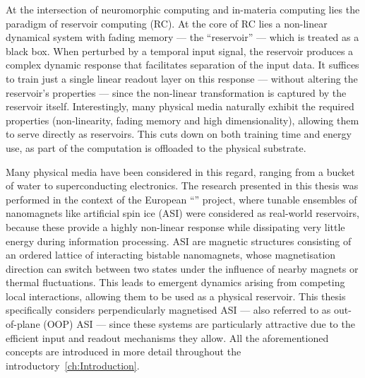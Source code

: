 At the intersection of neuromorphic computing and in-materia computing lies the paradigm of reservoir computing (RC).
At the core of RC lies a non-linear dynamical system with fading memory --- the ``reservoir'' --- which is treated as a black box.
When perturbed by a temporal input signal, the reservoir produces a complex dynamic response that facilitates separation of the input data.
It suffices to train just a single linear readout layer on this response --- without altering the reservoir's properties --- since the non-linear transformation is captured by the reservoir itself.
Interestingly, many physical media naturally exhibit the required properties (non-linearity, fading memory and high dimensionality), allowing them to serve directly as reservoirs.
This cuts down on both training time and energy use, as part of the computation is offloaded to the physical substrate. \par
Many physical media have been considered in this regard, ranging from a bucket of water to superconducting electronics. %
The research presented in this thesis was performed in the context of the European ``\spinengine'' project, where tunable ensembles of nanomagnets like artificial spin ice (ASI) were considered as real-world reservoirs, because these provide a highly non-linear response while dissipating very little energy during information processing.
ASI are magnetic structures consisting of an ordered lattice of interacting bistable nanomagnets, whose magnetisation direction can switch between two states under the influence of nearby magnets or thermal fluctuations.
This leads to emergent dynamics arising from competing local interactions, allowing them to be used as a physical reservoir.
This thesis specifically considers perpendicularly magnetised ASI --- also referred to as out-of-plane (OOP) ASI --- since these systems are particularly attractive due to the efficient input and readout mechanisms they allow.
All the aforementioned concepts are introduced in more detail throughout the introductory~\cref{ch:Introduction}. \\

